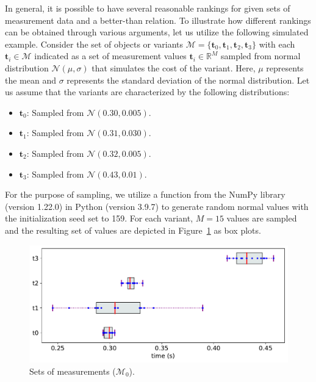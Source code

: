 \documentclass[acmsmall,screen, review]{acmart}
\begin{document}
In general, it is possible to have several reasonable rankings for given sets of measurement data and a better-than relation. To illustrate how different rankings can be obtained through various arguments, let us utilize the following simulated example. Consider the set of objects or variants  $\mathcal{M} = \{\mathbf{t}_0, \mathbf{t}_1, \mathbf{t}_2, \mathbf{t}_3\}$ with each $\mathbf{t}_i \in \mathcal{M}$ indicated as a set of measurement values $\mathbf{t}_i\in \mathbb{R}^{M}$ sampled from normal distribution $\mathcal{N}(\mu, \sigma)$ that simulates the cost of the variant. Here, $\mu$ represents the mean and $\sigma$ represents the standard deviation of the normal distribution. Let us assume that the variants are characterized by the following distributions:
\begin{itemize}
	\setlength{\itemsep}{0pt} 
	\item $\mathbf{t}_0$: Sampled from $\mathcal{N}(0.30,0.005)$.
	\item $\mathbf{t}_1$: Sampled from $\mathcal{N}(0.31,0.030)$.
	\item $\mathbf{t}_2$: Sampled from $\mathcal{N}(0.32,0.005)$.
	\item $\mathbf{t}_3$: Sampled from $\mathcal{N}(0.43, 0.01)$.
\end{itemize}
For the purpose of sampling, we utilize a function from the NumPy library (version 1.22.0) in Python (version 3.9.7) to generate random normal values with the initialization seed set to 159. For each variant, $M=15$ values are sampled and the resulting set of values are depicted in Figure~\ref{fig3:intro-eg} as box plots.
 \begin{figure}[h!]
	\centering
	\includegraphics[width=0.6\linewidth]{fig/ch3/pr-def2-3}
	\caption{Sets of measurements ($\mathcal{M}_0$).}
	\label{fig3:intro-eg}
\end{figure}
\end{document}
